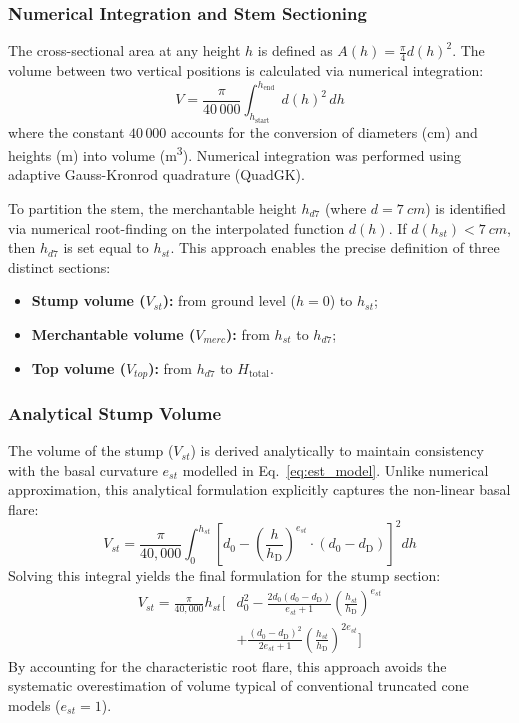 \documentclass[twocolumn, bibliography=totoc]{scrartcl}
\begin{document}
\subsubsection{Numerical Integration and Stem Sectioning}

The cross-sectional area at any height $h$ is defined as $A(h) = \frac{\pi}{4} d(h)^2$. The volume between two vertical positions is calculated via numerical integration:
\begin{equation}
    V = \frac{\pi}{40\,000} \int_{h_{\text{start}}}^{h_{\text{end}}} d(h)^2 \, dh
\end{equation}
where the constant $40\,000$ accounts for the conversion of diameters (\unit{cm}) and heights (\unit{m}) into volume (\unit{m^3}). Numerical integration was performed using adaptive Gauss-Kronrod quadrature (QuadGK).

To partition the stem, the merchantable height $h_{d7}$ (where $d = \qty{7}{cm}$) is identified via numerical root-finding on the interpolated function $d(h)$. If $d(h_{st}) < \qty{7}{cm}$, then $h_{d7}$ is set equal to $h_{st}$. This approach enables the precise definition of three distinct sections:
\begin{itemize}
    \item \textbf{Stump volume ($V_{st}$):} from ground level ($h=0$) to $h_{st}$;
    \item \textbf{Merchantable volume ($V_{merc}$):} from $h_{st}$ to $h_{d7}$;
    \item \textbf{Top volume ($V_{top}$):} from $h_{d7}$ to $H_{\text{total}}$.
\end{itemize}

\subsubsection{Analytical Stump Volume}

The volume of the stump ($V_{st}$) is derived analytically to maintain consistency with the basal curvature $e_{st}$ modelled in Eq.~\ref{eq:est_model}. Unlike numerical approximation, this analytical formulation explicitly captures the non-linear basal flare:
\begin{equation}
    V_{st} = \frac{\pi}{40,000} \int_{0}^{h_{st}} \left[ d_0 - \left( \frac{h}{h_{\text{D}}} \right)^{e_{st}} \cdot (d_0 - d_{\text{D}}) \right]^2 dh
\end{equation}
Solving this integral yields the final formulation for the stump section:
\begin{equation}
\begin{split}
    V_{st} = \frac{\pi}{40,000} h_{st} \biggl[ & d_0^2 - \frac{2 d_0 (d_0 - d_{\text{D}})}{e_{st}+1} \left(\frac{h_{st}}{h_{\text{D}}}\right)^{e_{st}} \\
    & + \frac{(d_0 - d_{\text{D}})^2}{2e_{st}+1} \left(\frac{h_{st}}{h_{\text{D}}}\right)^{2e_{st}} \biggr]
\end{split}
\end{equation}
By accounting for the characteristic root flare, this approach avoids the systematic overestimation of volume typical of conventional truncated cone models ($e_{st}=1$).
\end{document}
